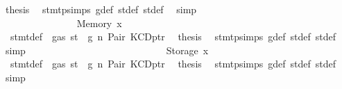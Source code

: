 \begin{isabellebody}
\ {\isacharquery}{\kern0pt}thesis\ \isamarkupfalse%
\ stmt{\isachardot}{\kern0pt}psimps{\isacharparenleft}{\kern0pt}{}{\isacharparenright}{\kern0pt}\ g{\isacharunderscore}{\kern0pt}def\ st{\isacharprime}{\kern0pt}{\isacharunderscore}{\kern0pt}def\ st{\isacharprime}{\kern0pt}{\isacharprime}{\kern0pt}{\isacharunderscore}{\kern0pt}def\ \isamarkupfalse%
\ simp\isanewline
\ \ \ \ \ \ \ \ \ \ \ \ \ \ \isamarkupfalse%
\isanewline
\ \ \ \ \ \ \ \ \ \ \ \ \isamarkupfalse%
\isanewline
\ \ \ \ \ \ \ \ \ \ \ \ \ \ \isamarkupfalse%
\ {\isacharparenleft}{\kern0pt}Memory\ x{}{\isacharparenright}{\kern0pt}\isanewline
\ \ \ \ \ \ \ \ \ \ \ \ \ \ \isamarkupfalse%
\ {}{\isacharparenleft}{\kern0pt}{}{\isacharparenright}{\kern0pt}\ stmt{\isacharunderscore}{\kern0pt}def\ {\isacharbackquoteopen}{\isasymnot}\ gas\ st\ {\isasymle}\ g{\isacharbackquoteclose}\ n\ Pair\ KCDptr\ \isamarkupfalse%
\ {\isacharquery}{\kern0pt}thesis\ \isamarkupfalse%
\ stmt{\isachardot}{\kern0pt}psimps{\isacharparenleft}{\kern0pt}{}{\isacharparenright}{\kern0pt}\ g{\isacharunderscore}{\kern0pt}def\ st{\isacharprime}{\kern0pt}{\isacharunderscore}{\kern0pt}def\ st{\isacharprime}{\kern0pt}{\isacharprime}{\kern0pt}{\isacharunderscore}{\kern0pt}def\ \isamarkupfalse%
\ simp\isanewline
\ \ \ \ \ \ \ \ \ \ \ \ \isamarkupfalse%
\isanewline
\ \ \ \ \ \ \ \ \ \ \ \ \ \ \isamarkupfalse%
\ {\isacharparenleft}{\kern0pt}Storage\ x{}{\isacharparenright}{\kern0pt}\isanewline
\ \ \ \ \ \ \ \ \ \ \ \ \ \ \isamarkupfalse%
\ {}{\isacharparenleft}{\kern0pt}{}{\isacharparenright}{\kern0pt}\ stmt{\isacharunderscore}{\kern0pt}def\ {\isacharbackquoteopen}{\isasymnot}\ gas\ st\ {\isasymle}\ g{\isacharbackquoteclose}\ n\ Pair\ KCDptr\ \isamarkupfalse%
\ {\isacharquery}{\kern0pt}thesis\ \isamarkupfalse%
\ stmt{\isachardot}{\kern0pt}psimps{\isacharparenleft}{\kern0pt}{}{\isacharparenright}{\kern0pt}\ g{\isacharunderscore}{\kern0pt}def\ st{\isacharprime}{\kern0pt}{\isacharunderscore}{\kern0pt}def\ st{\isacharprime}{\kern0pt}{\isacharprime}{\kern0pt}{\isacharunderscore}{\kern0pt}def\ \isamarkupfalse%
\ simp\isanewline
\ \ \ \ \ \ \ \ \ \ \ \ \isamarkupfalse%
\isanewline
\ \ \ \ \ \ \ \ \ \ \isamarkupfalse%
\isanewline
\ \ \ \ \ \ \ \ \ \ \ \ \isamarkupfalse%

\end{isabellebody}
